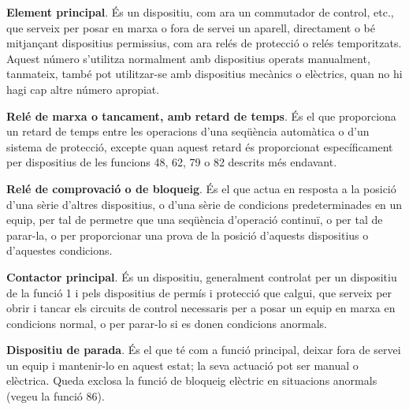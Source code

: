 \begin{multicols}{2}
\begin{list}{}
{\setlength{\labelwidth}{6mm} \setlength{\leftmargin}{6mm}
\setlength{\labelsep}{2mm}}

\item[\textbf{1}]  
\textbf{Element principal}. És un dispositiu, com ara un commutador de control, etc., que serveix per posar en marxa o fora de servei un aparell, directament o bé  mitjançant
dispositius permissius, com ara relés de protecció o relés temporitzats. Aquest número s'utilitza normalment amb dispositius operats manualment, tanmateix, també pot utilitzar-se amb dispositius mecànics o elèctrics, quan no hi hagi cap altre número apropiat.

\item[\textbf{2}]    
  
\textbf{Relé de marxa o tancament, amb retard de temps}. És el que
proporciona un retard de temps entre les operacions d'una seqüència
automàtica o d'un sistema de protecció, excepte quan aquest retard
és proporcionat específicament per dispositius de les funcions 48, 62, 79 o 82
descrits més endavant.

\item[\textbf{3}]  
 \textbf{Relé de comprovació o de bloqueig}. És el que actua en resposta a la posició d'una sèrie
d'altres dispositius, o d'una sèrie de condicions predeterminades
en un equip, per tal de permetre que una seqüència d'operació
continuï, o per tal de parar-la, o per proporcionar una prova de la
posició d'aquests dispositius o d'aquestes condicions.

\item[\textbf{4}]  
 \textbf{Contactor principal}. És un dispositiu,
generalment controlat per un dispositiu de la funció 1 i pels dispositius de permís i protecció
que calgui, que serveix per obrir i tancar els circuits de control necessaris per a posar un equip en marxa en condicions normal, o per parar-lo  si es donen condicions anormals.

\item[\textbf{5}]    
 \textbf{Dispositiu de parada}. És el que
té com a funció principal, deixar fora de servei un equip i
mantenir-lo en aquest estat; la seva actuació pot ser manual o
elèctrica. Queda exclosa la funció de bloqueig elèctric en
situacions anormals (vegeu la funció 86).


\end{list}
\end{multicols}
